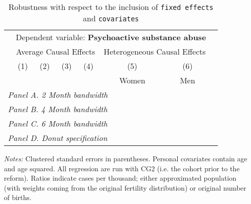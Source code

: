  \begin{table}[H] \begin{threeparttable} \centering \caption{Robustness with respect to the inclusion of \texttt{fixed effects} and \texttt{covariates}} {\def\sym#1{\ifmmode^{#1}\else\(^{#1}\)\fi} \begin{tabular}{l*{7}{c}} \toprule & \multicolumn{6}{c}{Dependent variable: \textbf{Psychoactive substance abuse}} \\ \cmidrule(lr){2-7}
            &\multicolumn{4}{c}{Average Causal Effects}         &\multicolumn{2}{c}{Heterogeneous Causal Effects}\\\cmidrule(lr){2-5}\cmidrule(lr){6-7}
            &\multicolumn{1}{c}{(1)}&\multicolumn{1}{c}{(2)}&\multicolumn{1}{c}{(3)}&\multicolumn{1}{c}{(4)}&\multicolumn{1}{c}{(5)}&\multicolumn{1}{c}{(6)}\\
            &\multicolumn{1}{c}{}&\multicolumn{1}{c}{}&\multicolumn{1}{c}{}&\multicolumn{1}{c}{}&\multicolumn{1}{c}{Women}&\multicolumn{1}{c}{Men}\\
\midrule
 \multicolumn{7}{l}{\emph{Panel A. 2 Month bandwidth}} \\    \midrule\multicolumn{7}{l}{\emph{Panel B. 4 Month bandwidth}} \\    \midrule\multicolumn{7}{l}{\emph{Panel C. 6 Month bandwidth}} \\    \midrule\multicolumn{7}{l}{\emph{Panel D. Donut specification}} \\    \midrule  
\bottomrule \end{tabular} } \begin{tablenotes} \item \scriptsize \emph{Notes:} Clustered standard errors in parentheses. Personal covariates contain age and age squared. All regression are run with CG2 (i.e. the cohort prior to the reform). Ratios indicate cases per thousand; either approximated population (with weights coming from the original fertility distribution) or original number of births. \end{tablenotes} \end{threeparttable} \end{table} 
